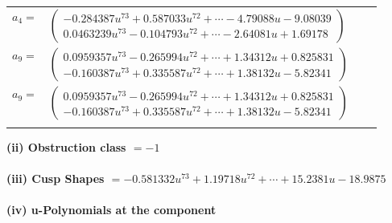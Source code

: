 \documentclass[1p]{elsarticle_modified}
\theoremstyle{definition}
\begin{document}
\begin{tabular}{m{7pt} m{180pt} m{7pt} m{180pt} }
\flushright $a_{4}=$&$\begin{pmatrix}-0.284387 u^{73}+0.587033 u^{72}+\cdots-4.79088 u-9.08039\\0.0463239 u^{73}-0.104793 u^{72}+\cdots-2.64081 u+1.69178\end{pmatrix}$ \\
\flushright $a_{9}=$&$\begin{pmatrix}0.0959357 u^{73}-0.265994 u^{72}+\cdots+1.34312 u+0.825831\\-0.160387 u^{73}+0.335587 u^{72}+\cdots+1.38132 u-5.82341\end{pmatrix}$\\ \flushright $a_{9}=$&$\begin{pmatrix}0.0959357 u^{73}-0.265994 u^{72}+\cdots+1.34312 u+0.825831\\-0.160387 u^{73}+0.335587 u^{72}+\cdots+1.38132 u-5.82341\end{pmatrix}$\\&\end{tabular}
\flushleft \textbf{(ii) Obstruction class $= -1$}\\~\\
\flushleft \textbf{(iii) Cusp Shapes $= -0.581332 u^{73}+1.19718 u^{72}+\cdots+15.2381 u-18.9875$}\\~\\
\newpage\renewcommand{\arraystretch}{1}
\flushleft \textbf{(iv) u-Polynomials at the component}\newline \\
\end{document}
